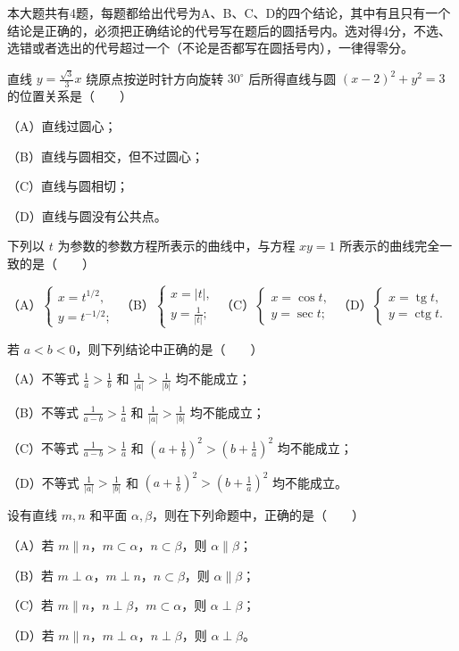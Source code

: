 本大题共有4题，每题都给出代号为A、B、C、D的四个结论，其中有且只有一个结论是正确的，必须把正确结论的代号写在题后的圆括号内。选对得4分，不选、选错或者选出的代号超过一个（不论是否都写在圆括号内），一律得零分。

\begin{question}
直线 $y=\frac{\sqrt3}{3}x$ 绕原点按逆时针方向旋转 $30^\circ$ 后所得直线与圆 $(x-2)^2+y^2=3$ 的位置关系是\mbox{（　　）}

（A）直线过圆心；

（B）直线与圆相交，但不过圆心；

（C）直线与圆相切；

（D）直线与圆没有公共点。

\end{question}
\begin{question}
下列以 $t$ 为参数的参数方程所表示的曲线中，与方程 $xy=1$ 所表示的曲线完全一致的是\mbox{（　　）}

（A）$\begin{cases}x=t^{1/2},\\ y=t^{-1/2};\end{cases}$
（B）$\begin{cases}x=|t|,\\ y=\frac1{|t|};\end{cases}$
（C）$\begin{cases}x=\cos t,\\ y=\sec t;\end{cases}$
（D）$\begin{cases}x=\operatorname{tg}t,\\ y=\operatorname{ctg}t.\end{cases}$

\end{question}
\begin{question}
若 $a<b<0$，则下列结论中正确的是\mbox{（　　）}

（A）不等式 $\frac1a>\frac1b$ 和 $\frac1{|a|}>\frac1{|b|}$ 均不能成立；

（B）不等式 $\frac1{a-b}>\frac1a$ 和 $\frac1{|a|}>\frac1{|b|}$ 均不能成立；

（C）不等式 $\frac1{a-b}>\frac1a$ 和 $\left(a+\frac1b\right)^2>\left(b+\frac1a\right)^2$ 均不能成立；

（D）不等式 $\frac1{|a|}>\frac1{|b|}$ 和 $\left(a+\frac1b\right)^2>\left(b+\frac1a\right)^2$ 均不能成立。

\end{question}
\begin{question}
设有直线 $m,n$ 和平面 $\alpha,\beta$，则在下列命题中，正确的是\mbox{（　　）}

（A）若 $m\parallel n$，$m\subset\alpha$，$n\subset\beta$，则 $\alpha\parallel\beta$；

（B）若 $m\perp\alpha$，$m\perp n$，$n\subset\beta$，则 $\alpha\parallel\beta$；

（C）若 $m\parallel n$，$n\perp\beta$，$m\subset\alpha$，则 $\alpha\perp\beta$；

（D）若 $m\parallel n$，$m\perp\alpha$，$n\perp\beta$，则 $\alpha\perp\beta$。

\end{question}

